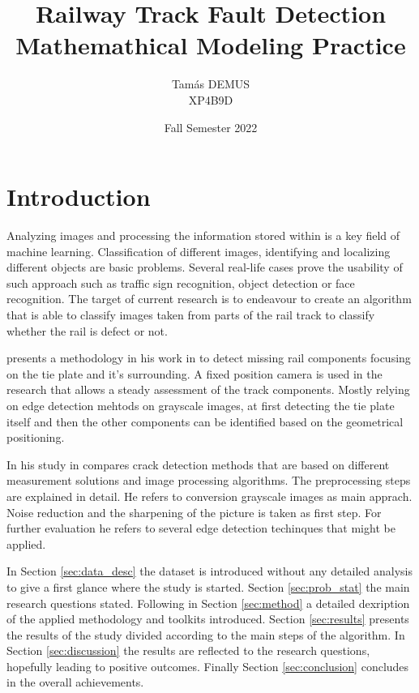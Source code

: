 \documentclass[10pt, final]{article}
\title{Railway Track Fault Detection\\\large Mathemathical Modeling Practice\\}
\author{Tamás DEMUS\\XP4B9D}
\date{Fall Semester 2022}
\begin{document}
	\maketitle
	\tableofcontents
	\section{Introduction}
		Analyzing images and processing the information stored within 
		is a key field of machine learning.
		Classification of different images, identifying and localizing 
		different objects are basic problems.
		Several real-life cases prove the usability of such approach 
		such as traffic sign recognition, object detection or face recognition.
		The target of current research is to endeavour to create an algorithm
		that is able to classify images taken from parts of the rail track
		to classify whether the rail is defect or not.

		\citeauthor{li_component-based_2011} presents a methodology \cite*{li_component-based_2011} 
		in his work in 
		to detect missing rail components focusing on the tie plate and it's surrounding.
		A fixed position camera is used in the research that allows a steady assessment of the track components.
		Mostly relying on edge detection mehtods on grayscale images, 
		at first detecting the tie plate itself and then the other components can be identified 
		based on the geometrical positioning.

		In his study \citeauthor{kumar_m_survey_2018} in  compares crack detection 
		methods that are based on different measurement solutions and image processing algorithms.
		The preprocessing steps are explained in detail.
		He refers to conversion grayscale images as main apprach.
		Noise reduction and the sharpening of the picture is taken as first step.
		For further evaluation he refers to several edge detection techinques that might be applied.

		In Section \ref{sec:data_desc} the dataset is introduced without any detailed analysis
		to give a first glance where the study is started. 
		Section \ref{sec:prob_stat} the main research questions stated. 
		Following in Section \ref{sec:method} a detailed dexription of the applied methodology
		and toolkits introduced.
		Section \ref{sec:results} presents the results of the study divided according to 
		the main steps of the algorithm.
		In Section \ref{sec:discussion} the results are reflected to the research questions, 
		hopefully leading to positive outcomes.
		Finally Section \ref{sec:conclusion} concludes in the overall achievements.
\end{document}
